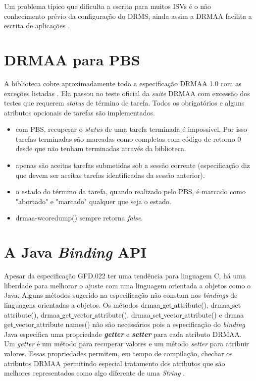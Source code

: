Um problema típico que dificulta a escrita para muitos ISVs é o não conhecimento prévio da configuração do DRMS, ainda assim a DRMAA facilita a escrita de aplicações \cite{Rajic2002}.

\section{DRMAA para PBS}

A biblioteca cobre aproximadamente toda a especificação DRMAA 1.0 com as exceções listadas \cite{drmaa_pbs}. Ela passou no teste oficial da \emph{suite} DRMAA com excessão dos testes que requerem \emph{status} de término de tarefa. Todos os obrigatórios e alguns atributos opcionais de tarefas são implementados.

\begin{itemize}
	\item com PBS, recuperar o \emph{status} de uma tarefa terminada é impossível. Por isso tarefas terminadas são marcadas como completas com código de retorno 0 desde que não tenham terminadas através da biblioteca.
	\item apenas são aceitas tarefas submetidas sob a sessão corrente (especificação diz que devem ser aceitas tarefas identificadas da sessão anterior).
	\item o estado do término da tarefa, quando realizado pelo PBS, é marcado como "abortado"  e  "marcado" qualquer que seja o estado.
	\item drmaa-wcoredump() sempre retorna \emph{false}.
\end{itemize}

\section{A Java \emph{Binding} API}

Apesar da especificação GFD.022 ter uma tendência para linguagem C, há uma liberdade para melhorar o ajuste com uma linguagem orientada a objetos como o Java. Alguns métodos sugerido na especificação não constam nos \emph{bindings} de linguagens orientadas a objetos. Os métodos drmaa\underline{ }get\underline{ }attribute(), drmaa\underline{ }set\underline{ }attribute(), drmaa\underline{ }get\underline{ }vector\underline{ }attribute(), drmaa\underline{ }set\underline{ }vector\underline{ }attribute() e drmaa\underline{ }get\underline{ }vector\underline{ } attribute \underline{ }names() não são necessários pois a especificação do \emph{binding} Java especifica uma propriedade \emph{\textbf{getter}} e \emph{\textbf{setter}} para cada atributo DRMAA. Um \emph{getter} é um método para recuperar valores e um método \emph{setter} para atribuir valores. Essas propriedades permitem, em tempo de compilação, chechar os atributos DRMAA permitindo especial tratamento dos atributos que são melhores representados como algo diferente de uma \emph{String} \cite{Templeton2003}.